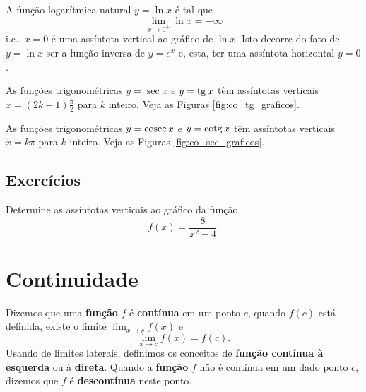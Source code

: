 \begin{ex}
  A função logarítmica natural $y = \ln x$ é tal que
  \begin{equation}
    \lim_{x\to 0^+} \ln x = -\infty
  \end{equation}
  i.e., $x=0$ é uma assíntota vertical ao gráfico de $\ln x$. Isto decorre do fato de $y = \ln x$ ser a função inversa de $y = e^x$ e, esta, ter uma assíntota horizontal $y=0$.
\end{ex}

\begin{ex}
  As funções trigonométricas $y = \sec x$ e $\displaystyle y = \operatorname{tg} x$ têm assíntotas verticais $x = (2k+1)\frac{\pi}{2}$ para $k$ inteiro. Veja as Figuras \ref{fig:co_tg_graficos}.
\end{ex}

\begin{ex}
  As funções trigonométricas $y = \operatorname{cosec} x$ e $\displaystyle y = \operatorname{cotg} x$ têm assíntotas verticais $x = k\pi$ para $k$ inteiro. Veja as Figuras \ref{fig:co_sec_graficos}.
\end{ex}

\subsection*{Exercícios}

\begin{exer}
  Determine as assíntotas verticais ao gráfico da função
  \begin{equation}
    f(x) = \frac{8}{x^2-4}.
  \end{equation}
\end{exer}

\emconstrucao

\section{Continuidade}\label{cap_lim_sec_cont}

Dizemos que uma {\bf função} $f$ é {\bf contínua}  em um ponto $c$, quando $f(c)$ está definida, existe o limite $\lim_{x\to c} f(x)$ e
\begin{equation}
  \lim_{x\to c} f(x) = f(c).
\end{equation}
Usando de limites laterais, definimos os conceitos de {\bf função contínua à esquerda} ou à {\bf direta}. Quando a {\bf função} $f$ não é contínua em um dado ponto $c$, dizemos que $f$ é {\bf descontínua} neste ponto.

